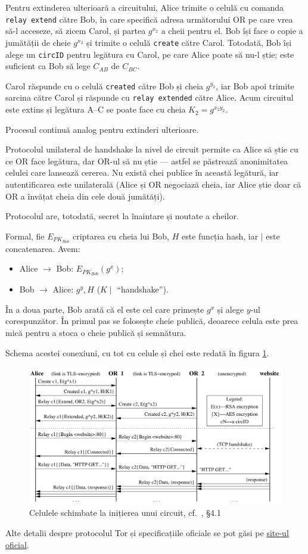 Pentru extinderea ulterioară a circuitului, Alice trimite o celulă cu
comanda \texttt{relay extend} către Bob, în care specifică adresa
următorului OR pe care vrea să-l acceseze, să zicem Carol, și partea
$ g^{x_2} $ a cheii pentru el. Bob își face o copie a jumătății de cheie
$ g^{x_2} $ și trimite o celulă \texttt{create} către Carol. Totodată,
Bob își alege un \texttt{circID} pentru legătura cu Carol, pe care Alice
poate să nu-l știe; este suficient ca Bob să lege $ C_{AB} $ de $ C_{BC} $.

Carol răspunde cu o celulă \texttt{created} către Bob și cheia $ g^{y_2} $, 
iar Bob apoi trimite sarcina către Carol și răspunde cu \texttt{relay extended} către Alice.
Acum circuitul este extins și legătura A--C se poate face cu cheia
$ K_2 = g^{x_2y_2} $.

Procesul continuă analog pentru extinderi ulterioare.

Protocolul unilateral de handshake la nivel de circuit permite ca Alice să
știe cu ce OR face legătura, dar OR-ul să nu știe --- astfel se
păstrează anonimitatea celulei care lansează cererea. Nu există chei publice
în această legătură, iar autentificarea este unilaterală (Alice și OR
negociază cheia, iar Alice știe doar că OR a învățat cheia din cele
două jumătăți).

Protocolul are, totodată, secret la înaintare și noutate a cheilor.

Formal, fie $ E_{PK_{Bob}} $ criptarea cu cheia lui Bob, $ H $ este funcția
hash, iar $ \mid $ este concatenarea. Avem:
\begin{itemize}
  \item Alice $ \longrightarrow $ Bob: $E_{PK_{Bob}}(g^x) $;
  \item Bob $ \longrightarrow $ Alice: $ g^y, H$ ($ K \mid$ ``handshake'').
\end{itemize}

În a doua parte, Bob arată că el este cel care primește $ g^x $ și alege
$ y $-ul corespunzător. În primul pas se folosește cheie publică, deoarece
celula este prea mică pentru a stoca o cheie publică și semnătura.

Schema acestei conexiuni, cu tot cu celule și chei este redată în figura \ref{fig:cells}.

\begin{figure}[!htbp]
  \centering
  \includegraphics{fig/cells.png}
  \caption{Celulele schimbate la inițierea unui circuit, cf.\ \cite{whitepaper}, \S4.1}
  \label{fig:cells}
\end{figure}



\vspace{1cm}

Alte detalii despre protocolul Tor și specificațiile oficiale se pot
găsi pe \href{https://gitweb.torproject.org/torspec.git/tree/}{site-ul oficial}.

